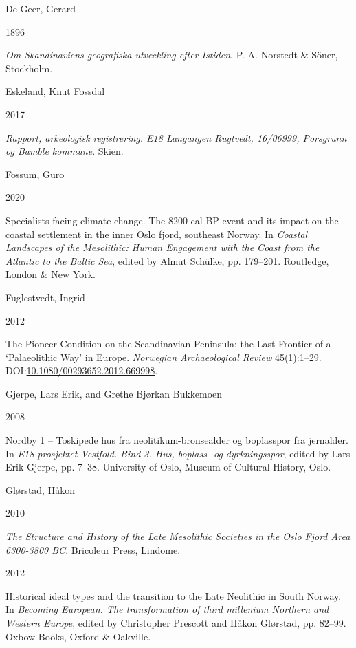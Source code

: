 \documentclass[
]{article}
\newlength{\cslhangindent}
\newlength{\csllabelwidth}
\newlength{\cslentryspacingunit} %
\newenvironment{CSLReferences}[2] %
 {%
  \setlength{\parindent}{0pt}
  \ifodd #1
  \let\oldpar\par
  \def\par{\hangindent=\cslhangindent\oldpar}
  \fi
  \setlength{\parskip}{#2\cslentryspacingunit}
 }%
 {}
\newcommand{\CSLBlock}[1]{#1\hfill\break}
\newcommand{\CSLLeftMargin}[1]{\parbox[t]{\csllabelwidth}{#1}}
\newcommand{\CSLRightInline}[1]{\parbox[t]{\linewidth - \csllabelwidth}{#1}\break}
\begin{document}
\begin{CSLReferences}{0}{0}
\leavevmode{}%
\CSLBlock{De Geer, Gerard}
\CSLLeftMargin{ 1896}
\CSLRightInline{\emph{{Om Skandinaviens geografiska utveckling efter Istiden}}. P. A. Norstedt \& Söner, Stockholm.}

\leavevmode{}%
\CSLBlock{Eskeland, Knut Fossdal}
\CSLLeftMargin{ 2017}
\CSLRightInline{\emph{{Rapport, arkeologisk registrering. E18 Langangen Rugtvedt, 16/06999, Porsgrunn og Bamble kommune}}. Skien.}

\leavevmode{}%
\CSLBlock{Fossum, Guro}
\CSLLeftMargin{ 2020}
\CSLRightInline{{Specialists facing climate change. The 8200 cal BP event and its impact on the coastal settlement in the inner Oslo fjord, southeast Norway}. In \emph{{Coastal Landscapes of the Mesolithic: Human Engagement with the Coast from the Atlantic to the Baltic Sea}}, edited by Almut Schülke, pp. 179--201. Routledge, London \& New York.}

\leavevmode{}%
\CSLBlock{Fuglestvedt, Ingrid}
\CSLLeftMargin{ 2012}
\CSLRightInline{{The Pioneer Condition on the Scandinavian Peninsula: the Last Frontier of a {`}Palaeolithic Way{'} in Europe}. \emph{Norwegian Archaeological Review} 45(1):1--29. DOI:\href{https://doi.org/10.1080/00293652.2012.669998}{10.1080/00293652.2012.669998}.}

\leavevmode{}%
\CSLBlock{Gjerpe, Lars Erik, and Grethe Bjørkan Bukkemoen}
\CSLLeftMargin{ 2008}
\CSLRightInline{{Nordby 1 -- Toskipede hus fra neolitikum-bronsealder og boplasspor fra jernalder}. In \emph{{E18-prosjektet Vestfold. Bind 3. Hus, boplass- og dyrkningsspor}}, edited by Lars Erik Gjerpe, pp. 7--38. University of Oslo, Museum of Cultural History, Oslo.}

\leavevmode{}%
\CSLBlock{Glørstad, Håkon}
\CSLLeftMargin{ 2010}
\CSLRightInline{\emph{{The Structure and History of the Late Mesolithic Societies in the Oslo Fjord Area 6300-3800 BC}}. Bricoleur Press, Lindome.}

\leavevmode{}%
\CSLLeftMargin{ 2012 }
\CSLRightInline{{Historical ideal types and the transition to the Late Neolithic in South Norway}. In \emph{{Becoming European. The transformation of third millenium Northern and Western Europe}}, edited by Christopher Prescott and Håkon Glørstad, pp. 82--99. Oxbow Books, Oxford \& Oakville.}


\end{CSLReferences}
\end{document}
